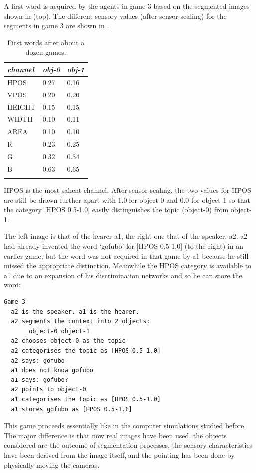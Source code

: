 A first word is acquired by the agents in game 3 
based on the segmented images shown in  (top).
The different sensory values (after sensor-scaling)
for the segments in game 3 are shown in . 


\begin{table}
\begin{center}
\begin{tabular}{ l  l  l }
\lsptoprule
{\itshape channel}& {\itshape obj-0} & {\itshape obj-1}\\ \midrule
HPOS & 0.27 & 0.16\\ 
VPOS & 0.20 & 0.20\\ 
HEIGHT & 0.15 & 0.15\\ 
WIDTH & 0.10 & 0.11\\ 
AREA & 0.10 & 0.10\\ 
R & 0.23 & 0.25\\ 
G & 0.32 & 0.34\\ 
B & 0.63 & 0.65\\ 
\lspbottomrule
\end{tabular}
\caption{ \label{tab:game3b} First words after about a dozen games.}
\end{center}
\end{table}

HPOS is the most salient channel. After sensor-scaling, 
the two values for HPOS are still be drawn further
apart with 1.0 for object-0 and 
0.0 for object-1 so that the category [HPOS 0.5-1.0] easily 
distinguishes the topic (object-0) from object-1.

The left image is that of the hearer {\bfshape a1}, the right one
that of the speaker, {\bfshape a2}.
{\bfshape a2} had already invented the word `gofubo' for 
[HPOS 0.5-1.0] (to the right) in an earlier game, 
but the word was not acquired in that game
by {\bfshape a1} because he still missed the 
appropriate distinction. Meanwhile the HPOS category 
is available to {\bfshape a1} due to an
expansion of his discrimination networks
and so he can store the word: 
\begin{verbatim}
Game 3 
  a2 is the speaker. a1 is the hearer. 
  a2 segments the context into 2 objects: 
       object-0 object-1
  a2 chooses object-0 as the topic 
  a2 categorises the topic as [HPOS 0.5-1.0]
  a2 says: gofubo
  a1 does not know gofubo
  a1 says: gofubo?
  a2 points to object-0
  a1 categorises the topic as [HPOS 0.5-1.0]
  a1 stores gofubo as [HPOS 0.5-1.0]
\end{verbatim}
This game proceeds essentially like in the computer
simulations studied before. The major difference is
that now real images have been used, the objects
considered are the outcome of segmentation processes,
the sensory characteristics have been derived from the 
image itself, and the pointing has been done by 
physically moving the cameras. 

